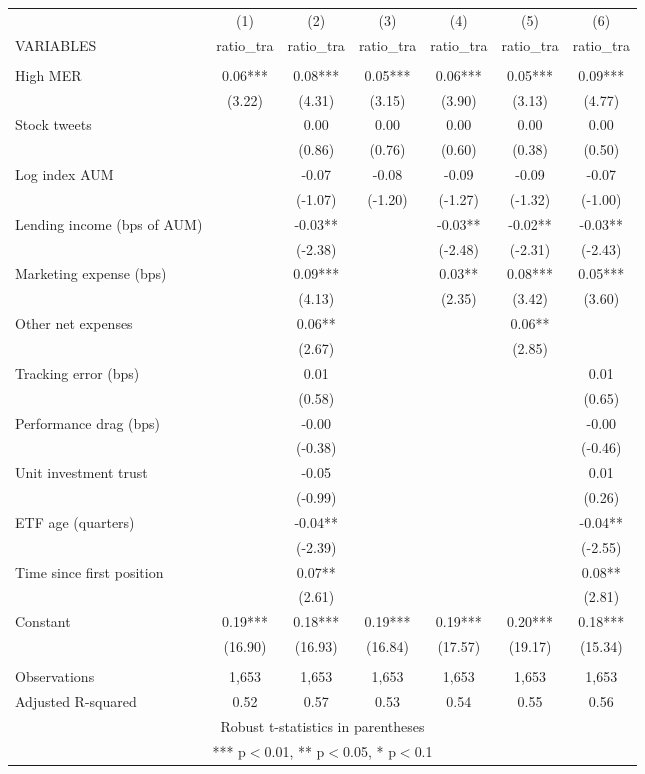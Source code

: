 \documentclass[]{article}
\begin{document}
\begin{tabular}{lcccccc} \hline
 & (1) & (2) & (3) & (4) & (5) & (6) \\
VARIABLES & ratio\_tra & ratio\_tra & ratio\_tra & ratio\_tra & ratio\_tra & ratio\_tra \\ \hline
 &  &  &  &  &  &  \\
High MER & 0.06*** & 0.08*** & 0.05*** & 0.06*** & 0.05*** & 0.09*** \\
 & (3.22) & (4.31) & (3.15) & (3.90) & (3.13) & (4.77) \\
Stock tweets &  & 0.00 & 0.00 & 0.00 & 0.00 & 0.00 \\
 &  & (0.86) & (0.76) & (0.60) & (0.38) & (0.50) \\
Log index AUM &  & -0.07 & -0.08 & -0.09 & -0.09 & -0.07 \\
 &  & (-1.07) & (-1.20) & (-1.27) & (-1.32) & (-1.00) \\
Lending income (bps of AUM) &  & -0.03** &  & -0.03** & -0.02** & -0.03** \\
 &  & (-2.38) &  & (-2.48) & (-2.31) & (-2.43) \\
Marketing expense (bps) &  & 0.09*** &  & 0.03** & 0.08*** & 0.05*** \\
 &  & (4.13) &  & (2.35) & (3.42) & (3.60) \\
Other net expenses &  & 0.06** &  &  & 0.06** &  \\
 &  & (2.67) &  &  & (2.85) &  \\
Tracking error (bps) &  & 0.01 &  &  &  & 0.01 \\
 &  & (0.58) &  &  &  & (0.65) \\
Performance drag (bps) &  & -0.00 &  &  &  & -0.00 \\
 &  & (-0.38) &  &  &  & (-0.46) \\
Unit investment trust &  & -0.05 &  &  &  & 0.01 \\
 &  & (-0.99) &  &  &  & (0.26) \\
ETF age (quarters) &  & -0.04** &  &  &  & -0.04** \\
 &  & (-2.39) &  &  &  & (-2.55) \\
Time since first position &  & 0.07** &  &  &  & 0.08** \\
 &  & (2.61) &  &  &  & (2.81) \\
Constant & 0.19*** & 0.18*** & 0.19*** & 0.19*** & 0.20*** & 0.18*** \\
 & (16.90) & (16.93) & (16.84) & (17.57) & (19.17) & (15.34) \\
 &  &  &  &  &  &  \\
Observations & 1,653 & 1,653 & 1,653 & 1,653 & 1,653 & 1,653 \\
 Adjusted R-squared & 0.52 & 0.57 & 0.53 & 0.54 & 0.55 & 0.56 \\ \hline
\multicolumn{7}{c}{ Robust t-statistics in parentheses} \\
\multicolumn{7}{c}{ *** p$<$0.01, ** p$<$0.05, * p$<$0.1} \\
\end{tabular}
\end{document}
